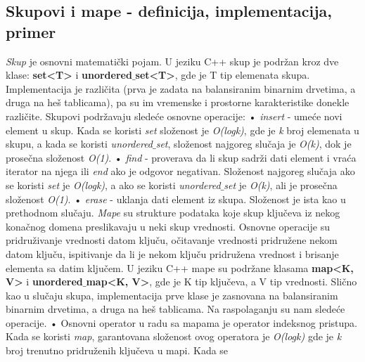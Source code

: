 \documentclass{article}
\begin{document}
\subsection{Skupovi i mape - definicija, implementacija, primer}
\textit{Skup} je osnovni matematički pojam. U jeziku C++ skup je podržan kroz dve klase: \textbf{set<T>} i \textbf{unordered$\_$set<T>},
gde je T tip elemenata skupa. Implementacija je različita (prva je zadata na
balansiranim binarnim drvetima, a druga na heš tablicama), pa su im vremenske i prostorne karakteristike
donekle različite.
Skupovi podržavaju sledeće osnovne operacije:
\newline \hspace*{0.4cm}• \textit{insert} - umeće novi element u skup. Kada se koristi \textit{set} složenost je \textit{O(logk)}, gde je \textit{k} broj
elemenata u skupu, a kada se koristi \textit{unordered$\_$set}, složenost najgoreg slučaja je \textit{O(k)}, dok je prosečna složenost \textit{O(1)}.
\newline \hspace*{0.4cm}• \textit{find} - proverava da li skup sadrži dati element i vraća iterator na njega
ili \textit{end} ako je odgovor negativan. Složenost
najgoreg slučaja ako se koristi \textit{set} je \textit{O(logk)}, a ako se koristi
\textit{unordered$\_$set} je \textit{O(k)}, ali je prosečna složenost \textit{O(1)}.
\newline \hspace*{0.4cm}• \textit{erase} - uklanja dati element iz skupa. Složenost je ista kao u prethodnom slučaju.
\vspace{1cm}\newline
\textit{Mape} su strukture podataka
koje skup ključeva iz nekog konačnog domena preslikavaju u neki skup vrednosti.
Osnovne operacije su pridruživanje vrednosti datom ključu, očitavanje vrednosti
pridružene nekom datom ključu, ispitivanje da li je nekom ključu pridružena
vrednost i brisanje elementa sa datim ključem.
U jeziku C++ mape su podržane klasama \textbf{map<K, V>} i \textbf{unordered$\_$map<K, V>},
gde je K tip ključeva, a V tip vrednosti. Slično kao u slučaju skupa, implementacija
prve klase je zasnovana na balansiranim binarnim drvetima, a druga na heš
tablicama. Na raspolaganju su nam sledeće operacije.
\newline \hspace*{0.4cm}• Osnovni operator u radu sa mapama je operator indeksnog pristupa. Kada se koristi \textit{map}, garantovana složenost ovog operatora
je \textit{O(logk)} gde je \textit{k} broj trenutno pridruženih ključeva u mapi. Kada se
\end{document}
